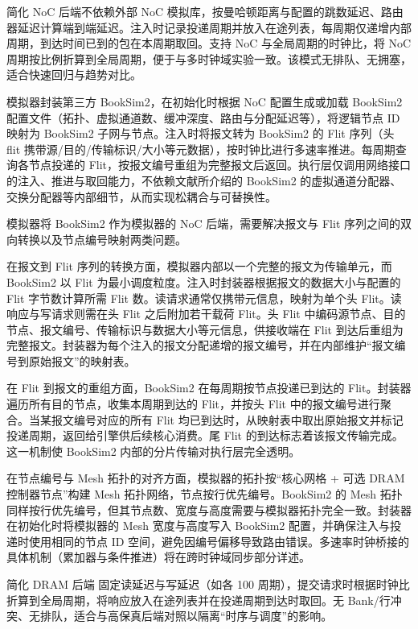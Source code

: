 简化 NoC 后端不依赖外部 NoC 模拟库，按曼哈顿距离与配置的跳数延迟、路由器延迟计算端到端延迟。注入时记录投递周期并放入在途列表，每周期仅递增内部周期，到达时间已到的包在本周期取回。支持 NoC 与全局周期的时钟比，将 NoC 周期按比例折算到全局周期，便于与多时钟域实验一致。该模式无排队、无拥塞，适合快速回归与趋势对比。

模拟器封装第三方 BookSim2，在初始化时根据 NoC 配置生成或加载 BookSim2 配置文件（拓扑、虚拟通道数、缓冲深度、路由与分配延迟等），将逻辑节点 ID 映射为 BookSim2 子网与节点。注入时将报文转为 BookSim2 的 Flit 序列（头 flit 携带源/目的/传输标识/大小等元数据），按时钟比进行多速率推进。每周期查询各节点投递的 Flit，按报文编号重组为完整报文后返回。执行层仅调用网络接口的注入、推进与取回能力，不依赖文献\parencite{jiang2013booksim}所介绍的 BookSim2 的虚拟通道分配器、交换分配器等内部细节，从而实现松耦合与可替换性。

模拟器将 BookSim2 作为模拟器的 NoC 后端，需要解决报文与 Flit 序列之间的双向转换以及节点编号映射两类问题。

在报文到 Flit 序列的转换方面，模拟器内部以一个完整的报文为传输单元，而 BookSim2 以 Flit 为最小调度粒度。注入时封装器根据报文的数据大小与配置的 Flit 字节数计算所需 Flit 数。读请求通常仅携带元信息，映射为单个头 Flit。读响应与写请求则需在头 Flit 之后附加若干载荷 Flit。头 Flit 中编码源节点、目的节点、报文编号、传输标识与数据大小等元信息，供接收端在 Flit 到达后重组为完整报文。封装器为每个注入的报文分配递增的报文编号，并在内部维护“报文编号到原始报文”的映射表。

在 Flit 到报文的重组方面，BookSim2 在每周期按节点投递已到达的 Flit。封装器遍历所有目的节点，收集本周期到达的 Flit，并按头 Flit 中的报文编号进行聚合。当某报文编号对应的所有 Flit 均已到达时，从映射表中取出原始报文并标记投递周期，返回给引擎供后续核心消费。尾 Flit 的到达标志着该报文传输完成。这一机制使 BookSim2 内部的分片传输对执行层完全透明。

在节点编号与 Mesh 拓扑的对齐方面，模拟器的拓扑按“核心网格 + 可选 DRAM 控制器节点”构建 Mesh 拓扑网络，节点按行优先编号。BookSim2 的 Mesh 拓扑同样按行优先编号，但其节点数、宽度与高度需要与模拟器拓扑完全一致。封装器在初始化时将模拟器的 Mesh 宽度与高度写入 BookSim2 配置，并确保注入与投递时使用相同的节点 ID 空间，避免因编号偏移导致路由错误。多速率时钟桥接的具体机制（累加器与条件推进）将在跨时钟域同步部分详述。


简化 DRAM 后端 固定读延迟与写延迟（如各 100 周期），提交请求时根据时钟比折算到全局周期，将响应放入在途列表并在投递周期到达时取回。无 Bank/行冲突、无排队，适合与高保真后端对照以隔离“时序与调度”的影响。

